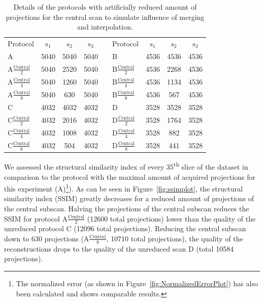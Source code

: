 \begin{table}
	\centering
	\caption{Details of the protocols with artificially reduced amount of projections for the central scan to simulate influence of merging and interpolation.}
	\begin{tabular}{lcccclccc}
		Protocol & $\textrm{s}_{1}$ & $\textrm{s}_{2}$ & $\textrm{s}_{3}$ &  &  Protocol & $\textrm{s}_{1}$ & $\textrm{s}_{2}$ & $\textrm{s}_{3}$ \\
		A & 5040 & 5040 & 5040 &  &  B & 4536 & 4536 & 4536 \\
		A$\frac{\textrm{Central}}{2}$ & 5040 & 2520 & 5040 &  & B$\frac{\textrm{Central}}{2}$ & 4536 & 2268 & 4536 \\
		A$\frac{\textrm{Central}}{4}$ & 5040 & 1260 & 5040 &  & B$\frac{\textrm{Central}}{4}$ & 4536 & 1134 & 4536 \\
		A$\frac{\textrm{Central}}{8}$ & 5040 & 630 & 5040 &  & B$\frac{\textrm{Central}}{8}$ & 4536 & 567 & 4536 \\
		\hline
		C & 4032 & 4032 & 4032 &  &  D & 3528 & 3528 & 3528 \\
		C$\frac{\textrm{Central}}{2}$ & 4032 & 2016 & 4032 &  & D$\frac{\textrm{Central}}{2}$ & 3528 & 1764 & 3528 \\
		C$\frac{\textrm{Central}}{4}$ & 4032 & 1008 & 4032 &  & D$\frac{\textrm{Central}}{4}$ & 3528 & 882 & 3528 \\
		C$\frac{\textrm{Central}}{8}$ & 4032 & 504 & 4032 &  & D$\frac{\textrm{Central}}{8}$ & 3528 & 441 & 3528 \\
	\end{tabular}  
	\label{tab:abcd}
\end{table}

We assessed the structural similarity index \cite{Wang2004} of every 35\textsuperscript{th} slice of the dataset in comparison to the protocol with the maximal amount of acquired projections for this experiment (A)\footnote{The normalized error (as shown in Figure~\ref{fig:NormalizedErrorPlot}) has also been calculated and shows comparable results.}). As can be seen in Figure~\ref{fig:ssimplot}, the structural similarity index (SSIM) greatly decreases for a reduced amount of projections of the central subscan. Halving the projections of the central subscan reduces the SSIM for protocol A$\frac{\textrm{Central}}{2}$ (12600 total projections) lower than the quality of the unreduced protocol C (12096 total projections). Reducing the central subscan down to 630 projections (A$\frac{\textrm{Central}}{8}$, 10710 total projections), the quality of the reconstructions drops to the quality of the unreduced scan D (total 10584 projections). 

